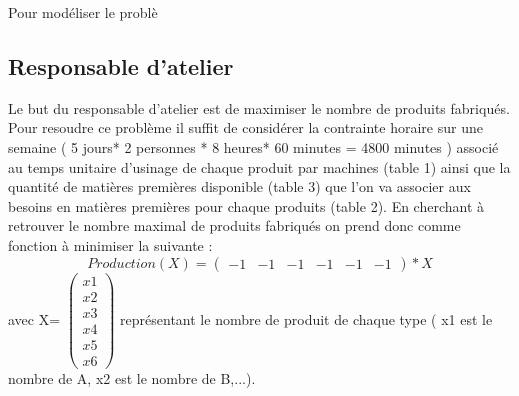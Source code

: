 \documentclass{article}
\begin{document}
Pour modéliser le problè

\subsection{Responsable d'atelier}
Le but du responsable d'atelier est de maximiser le nombre de produits fabriqués. 
Pour resoudre ce problème il suffit de considérer la contrainte horaire sur une semaine (  5 jours* 2 personnes * 8 heures* 60 minutes  = 4800 minutes ) associé au temps unitaire d'usinage de chaque produit par machines (table 1) ainsi que la quantité de matières premières disponible (table 3) que l'on va associer aux besoins en matières premières pour chaque produits  (table 2).
En cherchant à retrouver le nombre maximal de produits fabriqués on prend donc comme fonction à minimiser la suivante :
\[
Production(X) =
 \begin{pmatrix} 
   -1 & -1 & -1 & -1 & -1 & -1
   \end{pmatrix} *X
   \]
avec X= $\begin{pmatrix} 
   x1 \\ 
   x2 \\
   x3 \\
   x4 \\
   x5 \\ 
   x6 
  \end{pmatrix}$ représentant le nombre de produit de chaque type ( x1 est le nombre de A, x2 est le nombre de B,...). \\
\end{document}
